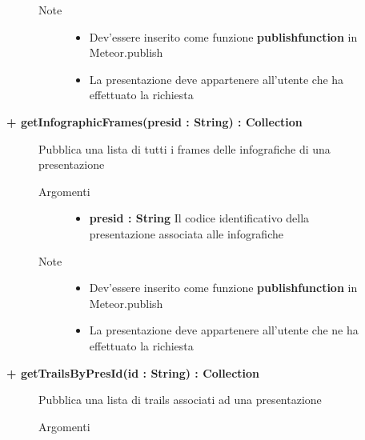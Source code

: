 \begin{description}
\begin{description}
\begin{description}
\begin{itemize}
				\end{itemize}
			\item[Note] \hfill
			\begin{itemize}
					\item Dev'essere inserito come funzione \textbf{publishfunction} in Meteor.publish
					\item La presentazione deve appartenere all'utente che ha effettuato la richiesta
				\end{itemize}
		\end{description}
	\end{description}
	
	\begin{description}
		\item[\textbf{\color{blue}+ getInfographicFrames(presid : String) : Collection			}] \hfill
			Pubblica una lista di tutti i frames delle infografiche di una presentazione
			
		\begin{description}
			\item[Argomenti] \hfill
				\begin{itemize}
				
					\item \textbf{presid : String			} \hfill
					Il codice identificativo della presentazione associata alle infografiche
					
				\end{itemize}
			\item[Note] \hfill
			\begin{itemize}
					\item Dev'essere inserito come funzione \textbf{publishfunction} in Meteor.publish
					\item La presentazione deve appartenere all'utente che ne ha effettuato la richiesta
				\end{itemize}
		\end{description}
	\end{description}
	
	\begin{description}
		\item[\textbf{\color{blue}+ getTrailsByPresId(id : String) : Collection			}] \hfill
			Pubblica una lista di trails associati ad una presentazione
			
		\begin{description}
			\item[Argomenti] \hfill
				\begin{itemize}
				

\end{itemize}
\end{description}
\end{description}
\end{description}
